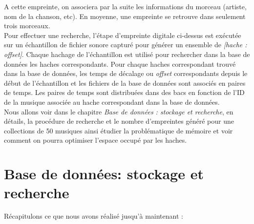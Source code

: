 \documentclass[11pt, report, french]{scrreprt}
\begin{document}
A cette empreinte, on associera par la suite les informations du morceau (artiste, nom de la chanson, etc). En moyenne, une empreinte se retrouve dans seulement trois morceaux.\\
Pour effectuer une recherche, l'étape d'empreinte digitale ci-dessus est exécutée sur un échantillon de fichier sonore capturé pour générer un ensemble de \textit{[hache : offset]}. Chaque hachage de l'échantillon est utilisé pour rechercher dans la base de données les haches correspondants. Pour chaque haches correspondant trouvé dans la base de données, les temps de décalage ou \textit{offset} correspondants depuis le début de l'échantillon et les fichiers de la base de données sont associés en paires de temps. Les paires de temps sont distribuées dans des bacs en fonction de l'ID de la musique associée au hache correspondant dans la base de données.\\

Nous allons voir dans le chapitre \textit{Base de données : stockage et recherche}, en détails, la procédure de recherche et le nombre d'empreintes généré pour une collections de 50 musiques ainsi étudier la problématique de mémoire et voir comment on pourra optimiser l'espace occupé par les haches.

\chapter{Base de données: stockage et recherche}
\label{bdd}
Récapitulons ce que nous avons réalisé jusqu'à maintenant :\\
\end{document}
